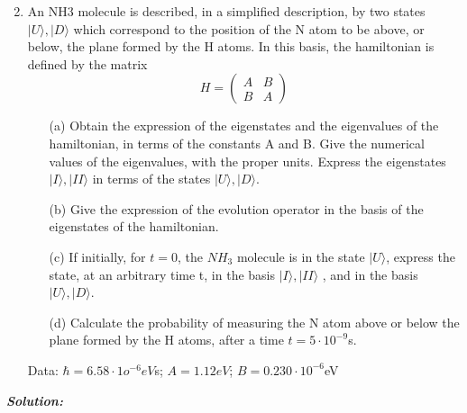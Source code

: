 \documentclass{article}
\begin{document}
\begin{mybox}
        \begin{enumerate}
        \setcounter{enumi}{1}
        \item An NH3 molecule is described, in a simplified description, by two states $|U\rangle, |D\rangle$ which correspond to the position of the N atom to be above, or below, the plane formed by the H atoms. In this basis, the hamiltonian is defined by the matrix
        $$
        H=      \begin{pmatrix}
                    A & B\\
                    B & A
                \end{pmatrix}
        $$
            \begin{itemize}
                \item[(a)] Obtain the expression of the eigenstates and the eigenvalues of the hamiltonian, in terms of the constants A and B. Give the numerical values of the eigenvalues, with the proper units. Express the eigenstates $|I\rangle, |II\rangle$ in terms of the states $|U\rangle, |D\rangle$.
                \item[(b)] Give the expression of the evolution operator in the basis of the eigenstates of the hamiltonian.
                \item[(c)] If initially, for $t = 0$, the $NH_3$ molecule is in the state $|U\rangle$, express the state, at an arbitrary time t, in the basis $|I\rangle, |II\rangle$ , and in the basis $|U\rangle, |D\rangle$.
                \item[(d)] Calculate the probability of measuring the N atom above or below the plane formed by the H atoms, after a time $t = 5\cdot 10^{-9} $s.
            \end{itemize}
        Data: $\hbar = 6.58 \cdot 1o^{-6} eV $s; $A=1.12eV$; $B=0.230 \cdot10^{-6}$eV
        \end{enumerate}
\end{mybox}
\emph{\bfseries Solution:} \\
\end{document}

